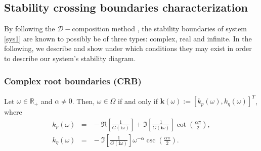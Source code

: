 \documentclass[twoside,reqno,11pt]{fcaa-var} %
\begin{document}
\subsection{Stability crossing boundaries characterization}
By following the $\mathcal{D}-$composition method \cite{gryazina2008d}, the stability boundaries of system \eqref{sys1} are known to possibly be of three types: complex, real and infinite. In the following, we describe and show under which conditions they may exist in order to describe our system's stability diagram.
\subsubsection{Complex root boundaries (CRB)}
\begin{proposition}\label{prop:CRB}
	Let $\omega\in\mathbb{R}_+$ and $\alpha\neq0$. Then, $\omega\in\Omega$ if and only if $\bm{k}(\omega):=\left[k_p(\omega),k_\eta(\omega)\right]^T$, where
	\begin{eqnarray}
	k_p(\omega)\!\!\!\!\!\!\!\!&=&\!\!\!\!\!\!\!\! -\Re\!\left[\frac{1}{G(\bm{i}\omega)}\right]\!+\!\Im\!\left[\frac{1}{G(\bm{i}\omega)}\right]\cot\left(\frac{\alpha\pi}{2}\right), \label{eqkp}\\
	k_\eta(\omega)\!\!\!\!\!\!\!\!&=& \!\!\!\!\!\!\!\! -\Im\!\left[\frac{1}{G(\bm{i}\omega)}\right]\omega^{-\alpha}\csc\left(\frac{\alpha\pi}{2}\right). \label{eqkd}
	\end{eqnarray}
\end{proposition}
\end{document}
